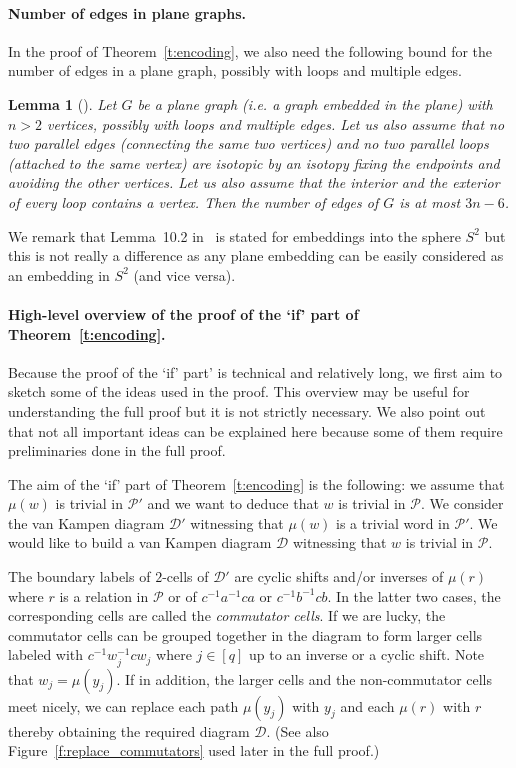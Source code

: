 \documentclass[10pt,a4paper]{article}
\newtheorem{lemma}[theorem]{Lemma}
\theoremstyle{definition}
\theoremstyle{remark}
\newcommand\DD{\mathcal{D}}
\newcommand\PP{\mathcal{P}}
\begin{document}
\paragraph{Number of edges in plane graphs.}
In the proof of Theorem~\ref{t:encoding}, we also need the following
bound for the number of edges in a plane graph, possibly with loops and
multiple edges.

\begin{lemma}[{\cite[Lemma~10.2]{matousek-sedgwick-tancer-wagner18}}]
\label{l:mstw}
  Let $G$ be a plane graph (i.e. a graph embedded in the plane) with $n > 2$
  vertices, possibly with loops and multiple edges. Let us also assume that no
  two parallel edges (connecting the same two vertices) and no two parallel
  loops (attached to the same vertex) are isotopic by an isotopy fixing the
  endpoints and avoiding the other vertices. Let us also assume that the
  interior and the exterior of every loop contains a vertex. Then the number of
  edges of $G$ is at most $3n -6$.
\end{lemma}

We remark that Lemma~10.2 in~\cite{matousek-sedgwick-tancer-wagner18} is stated
for embeddings into the sphere $S^2$ but this is not really a difference as any
plane embedding can be easily considered as an embedding in $S^2$ (and vice
versa).


\paragraph{High-level overview of the proof of the `if' part of
Theorem~\ref{t:encoding}.} Because the proof of the `if' part' is technical and
relatively long, we first aim to sketch some of the ideas used in the proof.
This overview may be useful for understanding the full proof but it is not
strictly necessary. We also point out that not all important ideas can be
explained here because some of them require preliminaries done in the full
proof.

The aim of the `if' part of Theorem~\ref{t:encoding} is the following: we
assume that $\mu(w)$ is trivial in $\PP'$ and we want to deduce that $w$ is
trivial in $\PP$. We consider the van Kampen diagram $\DD'$ 
witnessing that $\mu(w)$ is a trivial word in $\PP'$. We would like to build a
van Kampen diagram $\DD$ witnessing that $w$ is trivial in $\PP$.

The boundary labels of $2$-cells of $\DD'$ are cyclic shifts and/or inverses of
$\mu(r)$ where $r$ is a relation in $\PP$ or of $c^{-1}a^{-1}ca$ or
$c^{-1}b^{-1}cb$. In the latter two cases, the corresponding cells are called
the \emph{commutator cells}. If we are lucky, the commutator cells can be
grouped together in the diagram to form larger cells labeled with
$c^{-1}w_j^{-1}cw_j$ where $j \in [q]$ up to an inverse or a cyclic shift. Note
that $w_j = \mu(y_j)$. If in addition, the larger cells and the non-commutator
cells meet nicely, we can replace each path $\mu(y_j)$ with $y_j$ and each
$\mu(r)$ with $r$ thereby obtaining the required diagram $\DD$. (See also
Figure~\ref{f:replace_commutators} used later in the full proof.) 
\end{document}
